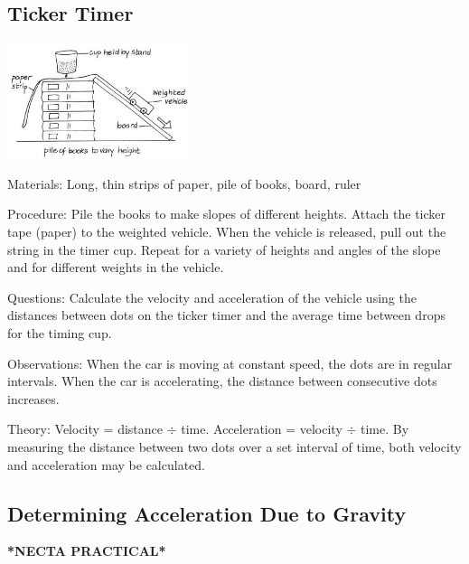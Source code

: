 \begin{multicols}{2}
\subsection{Ticker Timer}

\begin{center}
\includegraphics[width=0.4\textwidth]{./img/vso/ticker-timer.png}
\end{center}

\begin{description*}
\item[Materials:]{Long, thin strips of paper, pile of books, board, ruler}
\item[Procedure:]{Pile the books to make slopes of different heights. Attach the ticker tape (paper) to the weighted vehicle. When the vehicle is released, pull out the string in the timer cup. Repeat for a variety of heights and angles of the slope and for different weights in the vehicle.}
\item[Questions:]{Calculate the velocity and acceleration of the vehicle using the distances between dots on the ticker timer and the average time between drops for the timing cup.}
\item[Observations:]{When the car is moving at constant speed, the dots are in regular intervals. When the car is accelerating, the distance between consecutive dots increases.}
\item[Theory:]{Velocity = distance $\div$ time. Acceleration = velocity $\div$ time. By measuring the distance between two dots over a set interval of time, both velocity and acceleration may be calculated.}
\end{description*}

\subsection{Determining Acceleration Due to Gravity}
\textbf{*NECTA PRACTICAL*}


\end{multicols}
